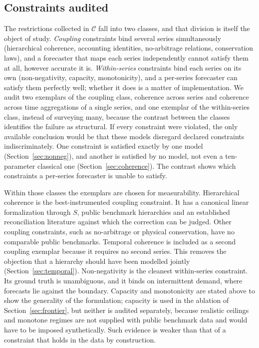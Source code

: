 \documentclass[review,number]{elsarticle}
\begin{document}
\subsection{Constraints audited}
\label{sec:whichconstraints}
The restrictions collected in
$\mathcal{C}$ fall into two classes, and that division is itself the object of study.
\emph{Coupling} constraints bind several series simultaneously (hierarchical
coherence, accounting identities, no-arbitrage relations, conservation laws), and a
forecaster that maps each series independently cannot satisfy them at all, however
accurate it is. \emph{Within-series} constraints bind each series on its
own (non-negativity, capacity, monotonicity), and a per-series forecaster can
satisfy them perfectly well; whether it does is a matter of implementation. We audit
two exemplars of the coupling class, coherence across series and
coherence across time aggregations of a single series, and one exemplar of the
within-series class, instead of surveying many, because the contrast between
the classes identifies the failure as structural. If every constraint were violated,
the only available conclusion
would be that these models disregard declared constraints indiscriminately. One
constraint is satisfied exactly by one model (Section~\ref{sec:nonneg}), and another is
satisfied by no model, not even a ten-parameter classical one
(Section~\ref{sec:coherence}). The contrast shows which constraints a per-series
forecaster is unable to satisfy.

Within those classes the exemplars are chosen for measurability. Hierarchical
coherence is the best-instrumented coupling constraint. It has a canonical linear
formalization through $S$, public benchmark hierarchies and an established
reconciliation literature against which the correction can be judged. Other coupling
constraints, such as no-arbitrage or physical conservation, have no comparable public
benchmarks.
Temporal coherence is included as a second coupling exemplar because it
requires no second series. This removes the objection that a hierarchy should
have been modelled jointly (Section~\ref{sec:temporal}).
Non-negativity is the cleanest within-series constraint. Its ground truth is
unambiguous, and it binds on intermittent demand, where forecasts lie
against the boundary. Capacity and monotonicity are stated above to show
the generality of the formulation; capacity is used in the ablation of
Section~\ref{sec:frontier}, but neither is audited separately, because realistic
ceilings and monotone regimes are not supplied with public benchmark data and would
have to be imposed synthetically. Such evidence is weaker than that of a constraint that
holds in the data by construction.
\end{document}
